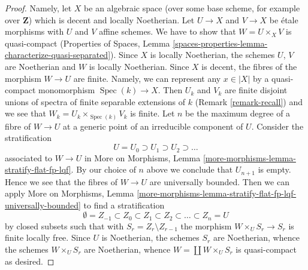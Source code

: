 \documentclass{stacks-project}
\theoremstyle{plain}
\theoremstyle{definition}
\theoremstyle{remark}
\numberwithin{equation}{subsection}
\def\Spec{\mathop{\mathrm{Spec}}}
\begin{document}
\begin{proof}
Namely, let $X$ be an algebraic space (over some base scheme, for
example over $\mathbf{Z}$) which is decent and locally Noetherian.
Let $U \to X$ and $V \to X$ be \'etale morphisms with $U$ and $V$
affine schemes. We have to show that $W = U \times_X V$ is quasi-compact
(Properties of Spaces, Lemma
\ref{spaces-properties-lemma-characterize-quasi-separated}).
Since $X$ is locally Noetherian, the schemes $U$, $V$ are Noetherian
and $W$ is locally Noetherian. Since $X$ is decent, the fibres
of the morphism $W \to U$ are finite. Namely, we can represent
any $x \in |X|$ by a quasi-compact monomorphism $\Spec(k) \to X$.
Then $U_k$ and $V_k$ are finite disjoint unions of spectra of
finite separable extensions of $k$ (Remark \ref{remark-recall})
and we see that $W_k = U_k \times_{\Spec(k)} V_k$ is finite.
Let $n$ be the maximum degree of a fibre of $W \to U$ at a generic
point of an irreducible component of $U$. Consider the stratification
$$
U = U_0 \supset U_1 \supset U_2 \supset \ldots
$$
associated to $W \to U$ in
More on Morphisms, Lemma \ref{more-morphisms-lemma-stratify-flat-fp-lqf}.
By our choice of $n$ above we conclude that $U_{n + 1}$ is empty.
Hence we see that the fibres of $W \to U$ are universally bounded.
Then we can apply More on Morphisms, Lemma
\ref{more-morphisms-lemma-stratify-flat-fp-lqf-universally-bounded}
to find a stratification
$$
\emptyset = Z_{-1} \subset Z_0 \subset Z_1 \subset Z_2 \subset
\ldots \subset Z_n = U
$$
by closed subsets such that with $S_r = Z_r \setminus Z_{r - 1}$
the morphism $W \times_U S_r \to S_r$ is finite locally free.
Since $U$ is Noetherian, the schemes $S_r$ are Noetherian,
whence the schemes $W \times_U S_r$ are Noetherian, whence
$W = \coprod W \times_U S_r$ is quasi-compact as desired.
\end{proof}
\end{document}
